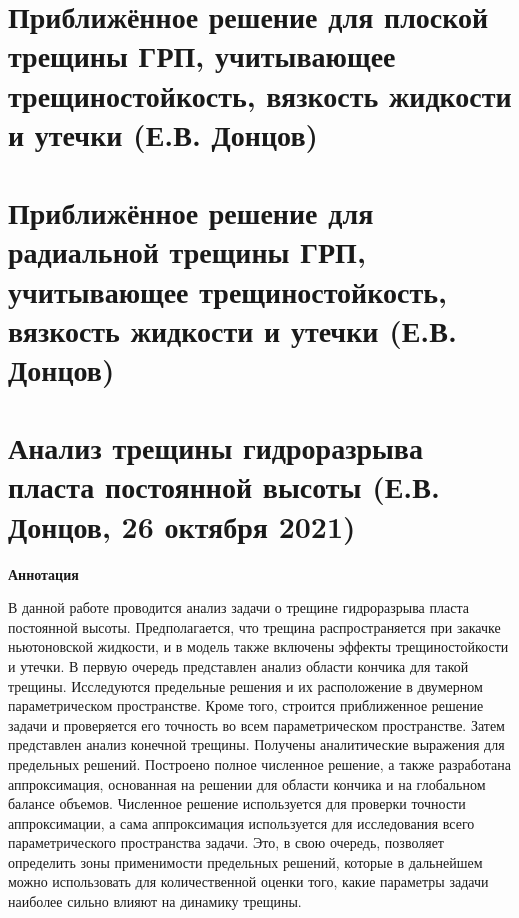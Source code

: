 \documentclass[a4paper, 12pt]{article}
\begin{document}
\tableofcontents
\newpage

\setlength{\jot}{10pt}

\section*{Приближённое решение для плоской трещины ГРП, учитывающее трещиностойкость, вязкость жидкости и утечки (Е.В. Донцов)}



\newpage
\setcounter{figure}{0}

\section*{Приближённое решение для радиальной трещины ГРП, учитывающее трещиностойкость, вязкость жидкости и утечки (Е.В. Донцов)}



\newpage
\setcounter{figure}{0}

\section*{Анализ трещины гидроразрыва пласта постоянной высоты (Е.В. Донцов, 26 октября 2021)}

\textbf{Аннотация}

В данной работе проводится анализ задачи о трещине гидроразрыва пласта постоянной высоты.
Предполагается, что трещина распространяется при закачке ньютоновской жидкости, и в модель также включены эффекты трещиностойкости и утечки.
В первую очередь представлен анализ области кончика для такой трещины.
Исследуются предельные решения и их расположение в двумерном параметрическом пространстве.
Кроме того, строится приближенное решение задачи и проверяется его точность во всем параметрическом пространстве.
Затем представлен анализ конечной трещины.
Получены аналитические выражения для предельных решений.
Построено полное численное решение, а также разработана аппроксимация, основанная на решении для области кончика и на глобальном балансе объемов.
Численное решение используется для проверки точности аппроксимации, а сама аппроксимация используется для исследования всего параметрического пространства задачи.
Это, в свою очередь, позволяет определить зоны применимости предельных решений, которые в дальнейшем можно использовать для количественной оценки того, какие параметры задачи наиболее сильно влияют на динамику трещины.
\end{document}
